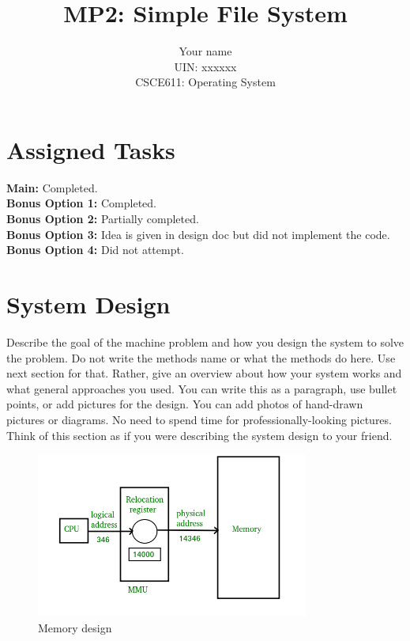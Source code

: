 \documentclass{article}
\title{MP2: Simple File System}
\author{Your name\\UIN: xxxxxx\\CSCE611: Operating System}
\begin{document}
\date{}
\maketitle


\section*{Assigned Tasks}

\textbf{Main:} Completed. \\
\textbf{Bonus Option 1:} Completed. \\
\textbf{Bonus Option 2:} Partially completed. \\
\textbf{Bonus Option 3:} Idea is given in design doc but did not implement the code. \\
\textbf{Bonus Option 4:} Did not attempt. \\


\section*{System Design}

Describe the goal of the machine problem and how you design the system to solve the problem. Do not write the methods name or what the methods do here. Use next section for that. Rather, give an overview about how your system works and what general approaches you used. You can write this as a paragraph, use bullet points, or add pictures for the design. You can add photos of hand-drawn pictures or diagrams. No need to spend time for professionally-looking pictures. Think of this section as if you were describing the system design to your friend.

\begin{figure}[!h]
\centering
\includegraphics[width=0.8\textwidth]{figs/memory_design.png}
\caption{Memory design}
\end{figure}
\end{document}
